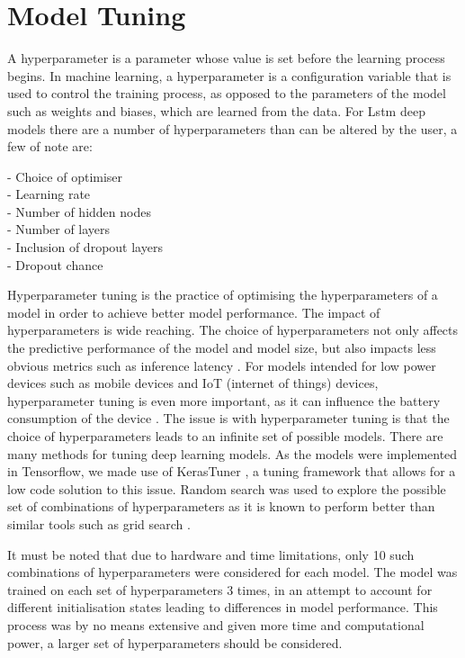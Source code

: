 \section{Model Tuning}
\label{sec:model_tuning}
A hyperparameter is a parameter whose value is set before the learning process begins. In machine learning, a hyperparameter is a configuration variable that is used to control the training process, as opposed to the parameters of the model such as weights and biases, which are learned from the data. For Lstm deep models there are a number of hyperparameters than can be altered by the user, a few of note are:

- Choice of optimiser\\
- Learning rate \\
- Number of hidden nodes \\
- Number of layers \\
- Inclusion of dropout layers \\
- Dropout chance

Hyperparameter tuning is the practice of optimising the hyperparameters of a model in order to achieve better model performance. The impact of hyperparameters is wide reaching. The choice of hyperparameters not only affects the predictive performance of the model and model size, but also impacts less obvious metrics such as inference latency \cite{10.1145/3506695}. For models intended for low power devices such as mobile devices and IoT (internet of things) devices, hyperparameter tuning is even more important, as it can influence the battery consumption of the device \cite{10.1145/3506695}. The issue is with hyperparameter tuning is that the choice of hyperparameters leads to an infinite set of possible models. There are many methods for tuning deep learning models. As the models were implemented in Tensorflow, we made use of KerasTuner \cite{omalley2019kerastuner}, a tuning framework that allows for a low code solution to this issue. Random search was used to explore the possible set of combinations of hyperparameters as it is known to perform better than similar tools such as grid search \cite{bergstra2012random}. 

It must be noted that due to hardware and time limitations, only 10 such combinations of hyperparameters were considered for each model. The model was trained on each set of hyperparameters 3 times, in an attempt to account for different initialisation states leading to differences in model performance. This process was by no means extensive and given more time and computational power, a larger set of hyperparameters should be considered.

